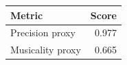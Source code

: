 \begin{tabular}{lr}\toprule
Metric & Score \\
\midrule
Precision proxy & 0.977 \\
Musicality proxy & 0.665 \\
\bottomrule
\end{tabular}
